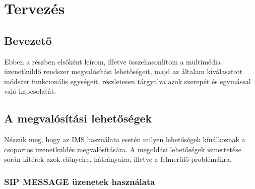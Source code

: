 

\section{Tervezés}

\subsection{Bevezető}

Ebben a részben elsőként leírom, illetve összehasonlítom a multimédia üzenetküldő rendszer megvalósítási lehetőségeit, majd az általam kiválasztott módszer funkcionális egységeit,  részletesen tárgyalva azok szerepét és egymással való kapcsolatát.

\subsection{A megvalósítási lehetőségek}

Nézzük meg, hogy az IMS használata esetén milyen lehetőségek kínálkoznak a csoportos üzenetküldés megvalósítására. A megoldási lehetőségek ismertetése során kitérek azok előnyeire, hátrányaira, illetve a felmerülő problémákra.

\subsubsection{SIP MESSAGE üzenetek használata}
\label{sec:sip_message}

